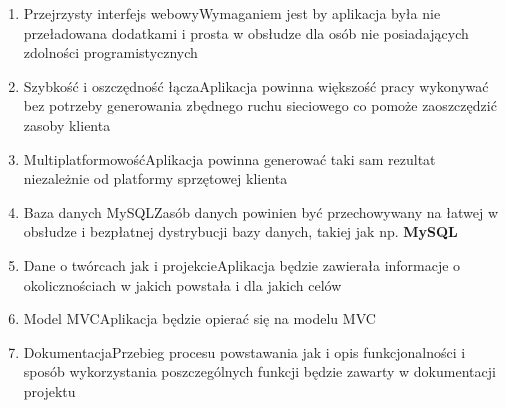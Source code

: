 \begin{enumerate}
  \item{Przejrzysty interfejs webowy}{Wymaganiem jest by aplikacja była nie przeładowana dodatkami i prosta w obsłudze dla osób nie posiadających zdolności programistycznych}
  \item{Szybkość i oszczędność łącza}{Aplikacja powinna większość pracy wykonywać bez potrzeby generowania zbędnego ruchu sieciowego co pomoże zaoszczędzić zasoby klienta}
  \item{Multiplatformowość}{Aplikacja powinna generować taki sam rezultat niezależnie od platformy sprzętowej klienta}
  \item{Baza danych MySQL}{Zasób danych powinien być przechowywany na łatwej w obsłudze i bezpłatnej dystrybucji bazy danych, takiej jak np. \textbf{MySQL}}
  \item{Dane o twórcach jak i projekcie}{Aplikacja będzie zawierała informacje o okolicznościach w jakich powstała i dla jakich celów}
  \item{Model MVC}{Aplikacja będzie opierać się na modelu MVC}
  \item{Dokumentacja}{Przebieg procesu powstawania jak i opis funkcjonalności i sposób wykorzystania poszczególnych funkcji będzie zawarty w dokumentacji projektu}
\end{enumerate}
